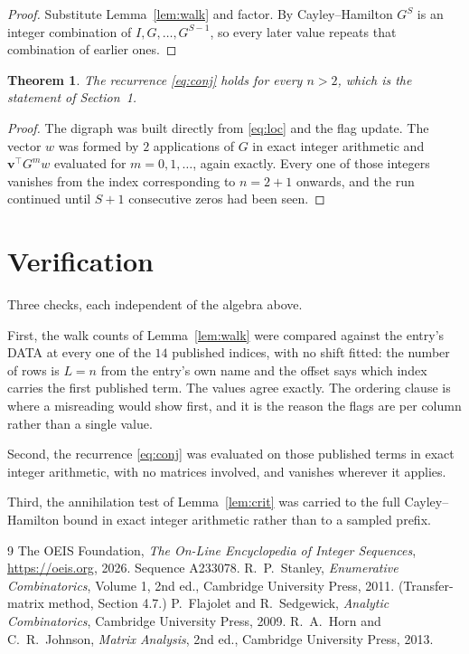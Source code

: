 \documentclass[11pt,a4paper]{article}
\theoremstyle{plain}
\newtheorem{theorem}{Theorem}
\theoremstyle{definition}
\begin{document}
\begin{proof}
Substitute Lemma~\ref{lem:walk} and factor. By Cayley--Hamilton $G^{S}$ is an integer
combination of $I,G,\dots,G^{S-1}$, so every later value repeats that combination of earlier
ones.
\end{proof}

\begin{theorem}
The recurrence \eqref{eq:conj} holds for every $n>2$, which is the statement of
Section~1.
\end{theorem}

\begin{proof}
The digraph was built directly from \eqref{eq:loc} and the flag update. The vector $w$ was
formed by $2$ applications of $G$ in exact integer arithmetic and
$\mathbf{v}^{\!\top}G^{m}w$ evaluated for $m=0,1,\dots$, again exactly. Every one of
those integers vanishes from the index corresponding to $n=2+1$ onwards, and the run
continued until $S+1$ consecutive zeros had been seen.
\end{proof}

\section{Verification}

Three checks, each independent of the algebra above.

First, the walk counts of Lemma~\ref{lem:walk} were compared against the entry's DATA at
every one of the $14$ published indices, with no shift fitted: the number of rows is
$L=n$ from the entry's own name and the offset says which index carries the first
published term. The values agree exactly. The ordering clause is where a misreading would
show first, and it is the reason the flags are per column rather than a single value.

Second, the recurrence \eqref{eq:conj} was evaluated on those published terms in exact
integer arithmetic, with no matrices involved, and vanishes wherever it applies.

Third, the annihilation test of Lemma~\ref{lem:crit} was carried to the full
Cayley--Hamilton bound in exact integer arithmetic rather than to a sampled prefix.

\begin{thebibliography}{9}
 The OEIS Foundation, \emph{The On-Line Encyclopedia of Integer
Sequences}, \url{https://oeis.org}, 2026. Sequence A233078.
 R.~P.~Stanley, \emph{Enumerative Combinatorics}, Volume 1, 2nd ed.,
Cambridge University Press, 2011. (Transfer-matrix method, Section 4.7.)
 P.~Flajolet and R.~Sedgewick, \emph{Analytic Combinatorics}, Cambridge
University Press, 2009.
 R.~A.~Horn and C.~R.~Johnson, \emph{Matrix Analysis}, 2nd ed., Cambridge
University Press, 2013.
\end{thebibliography}
\end{document}
